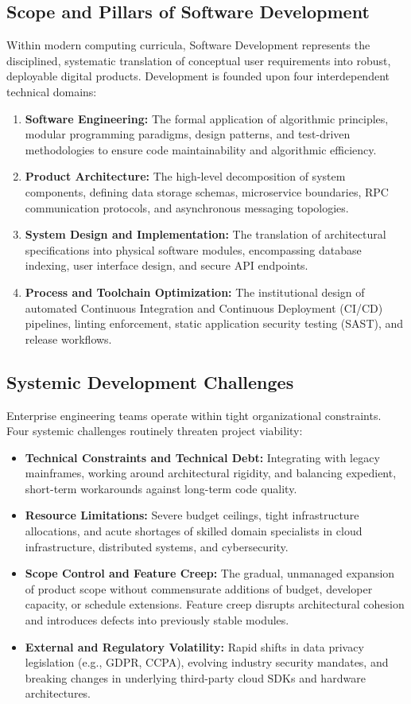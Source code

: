 \documentclass[11pt,a4paper]{article}
\begin{document}
\subsection{Scope and Pillars of Software Development}
Within modern computing curricula, Software Development represents the disciplined, systematic translation of conceptual user requirements into robust, deployable digital products. Development is founded upon four interdependent technical domains:
\begin{enumerate}
    \item \textbf{Software Engineering:} The formal application of algorithmic principles, modular programming paradigms, design patterns, and test-driven methodologies to ensure code maintainability and algorithmic efficiency.
    \item \textbf{Product Architecture:} The high-level decomposition of system components, defining data storage schemas, microservice boundaries, RPC communication protocols, and asynchronous messaging topologies.
    \item \textbf{System Design and Implementation:} The translation of architectural specifications into physical software modules, encompassing database indexing, user interface design, and secure API endpoints.
    \item \textbf{Process and Toolchain Optimization:} The institutional design of automated Continuous Integration and Continuous Deployment (CI/CD) pipelines, linting enforcement, static application security testing (SAST), and release workflows.
\end{enumerate}

\subsection{Systemic Development Challenges}
Enterprise engineering teams operate within tight organizational constraints. Four systemic challenges routinely threaten project viability:
\begin{itemize}
    \item \textbf{Technical Constraints and Technical Debt:} Integrating with legacy mainframes, working around architectural rigidity, and balancing expedient, short-term workarounds against long-term code quality.
    \item \textbf{Resource Limitations:} Severe budget ceilings, tight infrastructure allocations, and acute shortages of skilled domain specialists in cloud infrastructure, distributed systems, and cybersecurity.
    \item \textbf{Scope Control and Feature Creep:} The gradual, unmanaged expansion of product scope without commensurate additions of budget, developer capacity, or schedule extensions. Feature creep disrupts architectural cohesion and introduces defects into previously stable modules.
    \item \textbf{External and Regulatory Volatility:} Rapid shifts in data privacy legislation (e.g., GDPR, CCPA), evolving industry security mandates, and breaking changes in underlying third-party cloud SDKs and hardware architectures.
\end{itemize}
\end{document}
